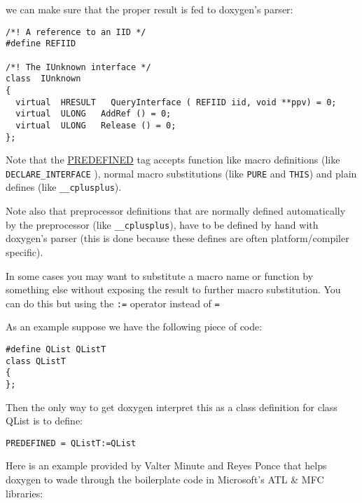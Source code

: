 we can make sure that the proper result is fed to doxygen's parser: 

\footnotesize\begin{verbatim}
/*! A reference to an IID */
#define REFIID

/*! The IUnknown interface */
class  IUnknown
{
  virtual  HRESULT   QueryInterface ( REFIID iid, void **ppv) = 0;
  virtual  ULONG   AddRef () = 0;
  virtual  ULONG   Release () = 0;
};
\end{verbatim}
\normalsize


Note that the \hyperlink{config_cfg_predefined}{PREDEFINED} tag accepts function like macro definitions (like {\tt DECLARE\_\-INTERFACE} ), normal macro substitutions (like {\tt PURE} and {\tt THIS}) and plain defines (like {\tt \_\-\_\-cplusplus}).

Note also that preprocessor definitions that are normally defined automatically by the preprocessor (like {\tt \_\-\_\-cplusplus}), have to be defined by hand with doxygen's parser (this is done because these defines are often platform/compiler specific).

In some cases you may want to substitute a macro name or function by something else without exposing the result to further macro substitution. You can do this but using the {\tt :=} operator instead of {\tt =}

As an example suppose we have the following piece of code: 

\footnotesize\begin{verbatim}
#define QList QListT
class QListT
{
};
\end{verbatim}
\normalsize


Then the only way to get doxygen interpret this as a class definition for class QList is to define: 

\footnotesize\begin{verbatim}
PREDEFINED = QListT:=QList
\end{verbatim}
\normalsize


Here is an example provided by Valter Minute and Reyes Ponce that helps doxygen to wade through the boilerplate code in Microsoft's ATL \& MFC libraries:



